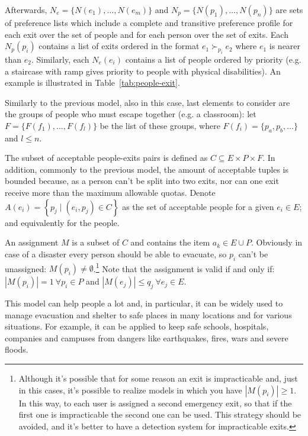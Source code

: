 Afterwards, \(N_e = \{N(e_1), \dots, N(e_m)\}\) and \(N_p = \{ N(p_1), \dots, N(p_n)\}\) are sets of preference lists which include a complete and transitive preference profile for each exit over the set of people and for each person over the set of exits. Each \(N_p(p_i)\) contains a list of exits ordered in the format \(e_1 \succ_{p_i} e_2\) where \(e_1\) is nearer than \(e_2\). Similarly, each \(N_e(e_i)\) contains a list of people ordered by priority (e.g. a staircase with ramp gives priority to people with physical disabilities). An example is illustrated in Table~\ref{tab:people-exit}.

Similarly to the previous model, also in this case, last elements to consider are the groups of people who must escape together (e.g. a classroom): let \(F=\{F(f_1), \dots, F(f_l)\}\) be the list of these groups, where \(F(f_i) = \{p_a, p_b, \dots\}\) and \(l\leq n\).

The subset of acceptable people-exits pairs is defined as \(C \subseteq E \times P \times F\). In addition, commonly to the previous model, the amount of acceptable tuples is bounded because, as a person can't be split into two exits, nor can one exit receive more than the maximum allowable quotas. Denote \( A \left( e_i \right) = \left\{ p_j \mid \left( e_i , p_j \right) \in C \right\} \) as the set of acceptable people for a given \( e_i \in E \); and equivalently for the people.

An assignment \(M\) is a subset of \(C\) and contains the item \( a_k \in E \cup P \). Obviously in case of a disaster every person should be able to evacuate, so  \( p_i\) can't be unassigned: \( M \left( p_i\right) \neq \emptyset \).\footnote{Although it's possible that for some reason an exit is impracticable and, just in this cases, it's possible to realize models in which you have \(|M \left( p_i \right)| \geq 1\). In this way, to each user is assigned a second emergency exit, so that if the first one is impracticable the second one can be used. This strategy should be avoided, and it's better to have a detection system for impracticable exits.}
Note that the assignment is valid if and only if: \(\left| M \left( p_i\right) \right| = 1 \ \forall p_i\in P\) and \(\left| M \left( e_j \right) \right| \leq q_j \ \forall e_j \in E\).

This model can help people a lot and, in particular, it can be widely used to manage evacuation and shelter to safe places in many locations and for various situations. For example, it can be applied to keep safe schools, hospitals, companies and campuses from dangers like earthquakes, fires, wars and severe floods.

